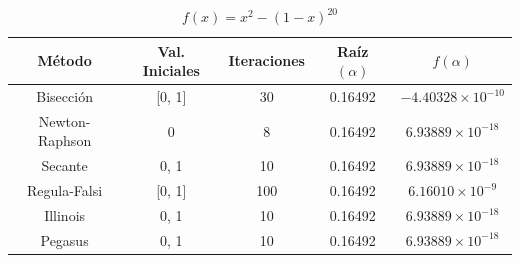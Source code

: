 \begin{table}[H]
\centering

\renewcommand{\arraystretch}{1.3} %
\setlength{\tabcolsep}{12pt}      %

\begin{tabular}{ccccc}
\hline
Método & Val. Iniciales & Iteraciones & Raíz $(\alpha)$ & $f(\alpha)$ \\
\hline

Bisección      & [0, 1] &  30 & 0.16492 & $-4.40328\times10^{-10}$ \\

Newton-Raphson & 0      &   8 & 0.16492 & $6.93889\times10^{-18}$ \\

Secante        & 0, 1   &  10 & 0.16492 & $6.93889\times10^{-18}$ \\

Regula-Falsi   & [0, 1] & 100 & 0.16492 & $6.16010\times10^{-9}$ \\

Illinois       & 0, 1   &  10 & 0.16492 & $6.93889\times10^{-18}$ \\

Pegasus        & 0, 1   &  10 & 0.16492 & $6.93889\times10^{-18}$ \\

\hline
\end{tabular}

\caption{$f(x) = x^{2} - \left(1 - x\right)^{20}$}
\end{table}


